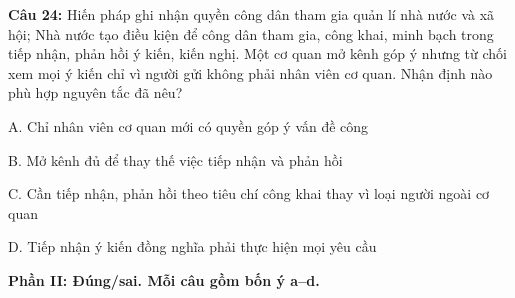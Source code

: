 \documentclass[12pt,a4paper]{article}
\begin{document}
\par\noindent\begin{minipage}{\linewidth}
\noindent\textbf{Câu 24:} Hiến pháp ghi nhận quyền công dân tham gia quản lí nhà nước và xã hội; Nhà nước tạo điều kiện để công dân tham gia, công khai, minh bạch trong tiếp nhận, phản hồi ý kiến, kiến nghị. Một cơ quan mở kênh góp ý nhưng từ chối xem mọi ý kiến chỉ vì người gửi không phải nhân viên cơ quan. Nhận định nào phù hợp nguyên tắc đã nêu?\par
\noindent A. Chỉ nhân viên cơ quan mới có quyền góp ý vấn đề công\par
\noindent B. Mở kênh đủ để thay thế việc tiếp nhận và phản hồi\par
\noindent C. Cần tiếp nhận, phản hồi theo tiêu chí công khai thay vì loại người ngoài cơ quan\par
\noindent D. Tiếp nhận ý kiến đồng nghĩa phải thực hiện mọi yêu cầu\par
\end{minipage}\par\vspace{0.12cm}

\textbf{Phần II: Đúng/sai. Mỗi câu gồm bốn ý a--d.}\par
\end{document}
